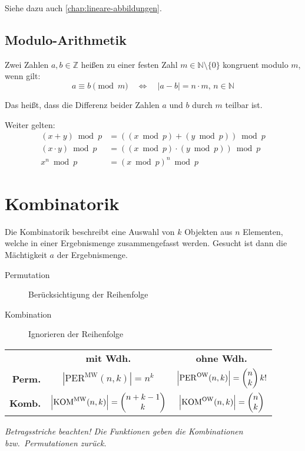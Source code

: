 Siehe dazu auch \cref{chap:lineare-abbildungen}.



\section{Modulo-Arithmetik}

Zwei Zahlen $a,b\in\mathbb{Z}$ heißen zu einer festen Zahl $m\in\mathbb{N}\setminus\{0\}$ kongruent modulo $m$, wenn gilt:
\[ a\equiv b \pmod m \quad \iff \quad \lvert a-b \rvert = n\cdot m,\,n\in\mathbb{N} \]

Das heißt, dass die Differenz beider Zahlen $a$ und $b$ durch $m$ teilbar ist.

Weiter gelten:
\begin{align*}
  (x +     y) \bmod p & =((x\bmod p)+(y\bmod p)) \bmod p \\
  (x \cdot y) \bmod p & =((x\bmod p)\cdot(y\bmod p))\bmod p\\
  x^n \bmod p         & = (x\bmod p)^n \bmod p
\end{align*}



\chapter{\label{chap:Kombinatorik}Kombinatorik}

Die Kombinatorik beschreibt eine Auswahl von $k$ Objekten aus $n$ Elementen, welche in einer Ergebnismenge zusammengefasst werden.
Gesucht ist dann die Mächtigkeit $a$ der Ergebnismenge.

\begin{description}
  \item [Permutation] 
	Berücksichtigung der Reihenfolge
  \item [Kombination] 
	Ignorieren der Reihenfolge
\end{description}

\noindent\begin{center}
\begin{tabular}{rcc}
              & \bfseries mit Wdh.
              & \bfseries ohne Wdh. \\
  \bfseries Perm.
              & $\left|\mathrm{PER}^{\mathrm{MW}}(n,k)\right| = n^k$
              & $\left|\mathrm{PER}^{\mathrm{OW}}(n,k)\right| = \vecc(n;k) k!$ \\[1.6667em]
  \bfseries Komb.
              & $\left|\mathrm{KOM}^{\mathrm{MW}}(n,k)\right| = \vecc(n+k-1;k)$
              & $\left|\mathrm{KOM}^{\mathrm{OW}}(n,k)\right| = \vecc(n;k)$
\end{tabular}

\vspace{0.66667em}
\emph{Betragsstriche beachten! Die Funktionen geben die Kombinationen bzw.~Permutationen zurück.}
\end{center}

